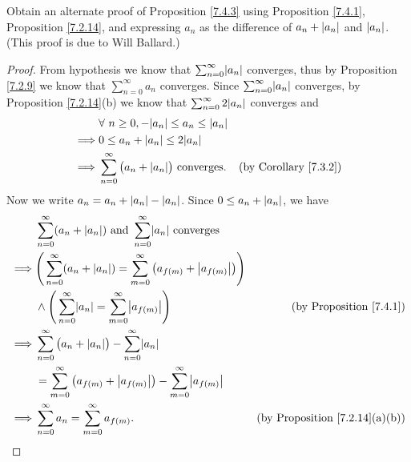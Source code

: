 \begin{exercise}\label{ex 7.4.2}
    Obtain an alternate proof of Proposition \ref{7.4.3} using Proposition \ref{7.4.1}, Proposition \ref{7.2.14}, and expressing \(a_n\) as the difference of \(a_n + \abs*{a_n}\) and \(\abs*{a_n}\).
    (This proof is due to Will Ballard.)
\end{exercise}

\begin{proof}
    From hypothesis we know that \(\sum_{n = 0}^\infty \abs*{a_n}\) converges, thus by Proposition \ref{7.2.9} we know that \(\sum_{n = 0}^\infty a_n\) converges.
    Since \(\sum_{n = 0}^\infty \abs*{a_n}\) converges, by Proposition \ref{7.2.14}(b) we know that \(\sum_{n = 0}^\infty 2 \abs*{a_n}\) converges and
    \begin{align*}
                 & \forall\ n \geq 0, -\abs*{a_n} \leq a_n \leq \abs*{a_n}                                               \\
        \implies & 0 \leq a_n + \abs*{a_n} \leq 2\abs*{a_n}                                                              \\
        \implies & \sum_{n = 0}^\infty \big(a_n + \abs*{a_n}\big) \text{ converges}. & \text{(by Corollary \ref{7.3.2})}
    \end{align*}
    Now we write \(a_n = a_n + \abs*{a_n} - \abs*{a_n}\).
    Since \(0 \leq a_n + \abs*{a_n}\), we have
    \begin{align*}
                 & \sum_{n = 0}^\infty (a_n + \abs*{a_n}) \text{ and } \sum_{n = 0}^\infty \abs*{a_n} \text{ converges}                                                       \\
        \implies & \Bigg(\sum_{n = 0}^\infty (a_n + \abs*{a_n}) = \sum_{m = 0}^\infty \big(a_{f(m)} + \abs*{a_{f(m)}}\big)\Bigg)                                              \\
                 & \land \Bigg(\sum_{n = 0}^\infty \abs*{a_n} = \sum_{m = 0}^\infty \abs*{a_{f(m)}}\Bigg)                        & \text{(by Proposition \ref{7.4.1})}        \\
        \implies & \sum_{n = 0}^\infty \big(a_n + \abs*{a_n}\big) - \sum_{n = 0}^\infty \abs*{a_n}                                                                            \\
                 & = \sum_{m = 0}^\infty \big(a_{f(m)} + \abs*{a_{f(m)}}\big) - \sum_{m = 0}^\infty \abs*{a_{f(m)}}                                                           \\
        \implies & \sum_{n = 0}^\infty a_n = \sum_{m = 0}^\infty a_{f(m)}.                                                       & \text{(by Proposition \ref{7.2.14}(a)(b))}
    \end{align*}
\end{proof}